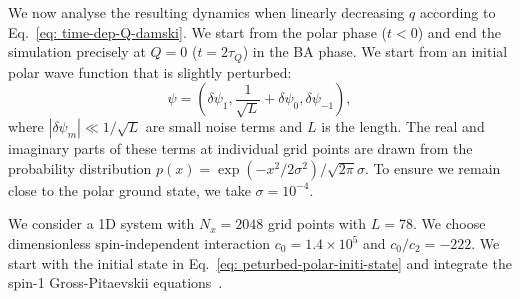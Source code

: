 We now analyse the resulting dynamics when linearly decreasing \( q \) according to
Eq.~\eqref{eq: time-dep-Q-damski}.
We start from the polar phase (\( t < 0 \)) and end the simulation precisely at
\( Q = 0 \) (\( t=2\tau_Q \)) in the BA phase.
We start from an initial polar wave function that is slightly perturbed:
\begin{equation}
    \psi = \left(\delta\psi_1, \frac{1}{\sqrt{L}} + \delta\psi_0,
    \delta\psi_{-1}\right),
    \label{eq: peturbed-polar-initi-state}
\end{equation}
where \( |\delta\psi_m| \ll 1 / \sqrt{L} \) are small noise terms and \( L \) is
the length.
The real and imaginary parts of these terms at individual grid points are drawn
from the probability distribution
\( p(x) = \exp(-x^2/2\sigma^2)/\sqrt{2\pi}\sigma \).
To ensure we remain close to the polar ground state, we take
\( \sigma=10^{-4} \).

We consider a 1D system with \(N_x = 2048\) grid points with \(L=78\).
We choose dimensionless spin-independent interaction \(c_0=1.4\times10^5\) and 
\(c_0/c_2 = -222\).
We start with the initial state in Eq.~\eqref{eq: peturbed-polar-initi-state}
and integrate the spin-1 Gross-Pitaevskii equations~\cite{Symes2016}.

